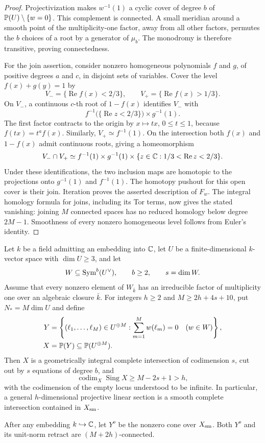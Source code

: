 \begin{proof}
Projectivization makes \(w^{-1}(1)\) a cyclic cover of degree \(b\) of
\(\mathbb P(U)\setminus\{w=0\}\).  This complement is connected.  A small
meridian around a smooth point of the multiplicity-one factor, away
from all other factors, permutes the \(b\) choices of a root by a
generator of \(\mu_b\).  The monodromy is therefore transitive, proving
connectedness.

For the join assertion, consider nonzero homogeneous polynomials
\(f\) and \(g\), of positive degrees \(a\) and \(c\), in disjoint sets
of variables.  Cover the level \(f(x)+g(y)=1\) by
\[
 V_-=\{\operatorname{Re}f(x)<2/3\},
 \qquad
 V_+=\{\operatorname{Re}f(x)>1/3\}.
\]
On \(V_-\), a continuous \(c\)-th root of \(1-f(x)\) identifies
\(V_-\) with
\[
 f^{-1}\bigl(\{\operatorname{Re}z<2/3\}\bigr)\times g^{-1}(1).
\]
The first factor contracts to the origin by \(x\mapsto tx\),
\(0\le t\le1\), because \(f(tx)=t^a f(x)\).  Similarly,
\(V_+\simeq f^{-1}(1)\).  On the intersection both \(f(x)\) and
\(1-f(x)\) admit continuous roots, giving a homeomorphism
\[
 V_-\cap V_+\simeq
 f^{-1}(1)\times g^{-1}(1)\times
 \{z\in\mathbb C:1/3<\operatorname{Re}z<2/3\}.
\]
Under these identifications, the two inclusion maps are homotopic
to the projections onto \(g^{-1}(1)\) and \(f^{-1}(1)\).
The homotopy pushout for this open cover is their join.  Iteration
proves the asserted description of \(F_w\).  The integral homology
formula for joins, including its Tor terms, now gives the stated
vanishing: joining \(M\) connected spaces has no reduced homology
below degree \(2M-1\).  Smoothness of every nonzero homogeneous level
follows from Euler's identity.
\end{proof}

\begin{theorem}
\label{thm:parameters}
Let \(k\) be a field admitting an embedding into \(\mathbb C\), let \(U\) be a
finite-dimensional \(k\)-vector space with \(\dim U\ge3\), and let
\[
 W\subseteq\operatorname{Sym}^b(U^\vee),\qquad b\ge2,\qquad s=\dim W.
\]
Assume that every nonzero element of \(W_{\bar k}\) has an irreducible
factor of multiplicity one over an algebraic closure \(\bar k\).
For integers \(h\ge2\) and \(M\ge2h+4s+10\), put \(N_*=M\dim U\)
and define
\[
 \begin{split}
 Y&=\left\{(\ell_1,\ldots,\ell_M)\in U^{\oplus M}:
                 \sum_{m=1}^M w(\ell_m)=0\quad(w\in W)\right\},\\
 X&=\mathbb P(Y)\subseteq\mathbb P(U^{\oplus M}).
 \end{split}
\]
Then \(X\) is a geometrically integral complete intersection of
codimension \(s\), cut out by \(s\) equations of degree \(b\), and
\[
 \operatorname{codim}_X\operatorname{Sing}X
       \ge M-2s+1>h,
\]
with the codimension of the empty locus understood to be infinite.
In particular, a general \(h\)-dimensional projective linear section
is a smooth complete intersection contained in \(X_{\mathrm{sm}}\).

After any embedding \(k\hookrightarrow\mathbb C\), let \(Y^o\) be the
nonzero cone over \(X_{\mathrm{sm}}\).  Both \(Y^o\) and its unit-norm
retract are \((M+2h)\)-connected.
\end{theorem}

